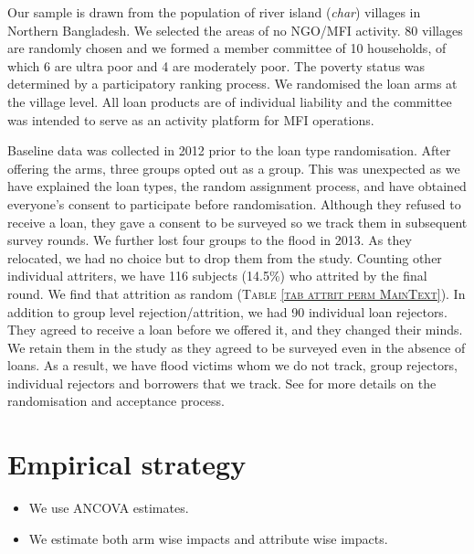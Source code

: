 	
	Our sample is drawn from the population of river island (\textit{char}) villages in Northern Bangladesh. We selected the areas of no NGO/MFI activity. 80 villages are randomly chosen and we formed a member committee of 10 households, of which 6 are ultra poor and 4 are moderately poor. The poverty status was determined by a participatory ranking process. We randomised the loan arms at the village level. All loan products are of individual liability and the committee was intended to serve as an activity platform for MFI operations. 

	Baseline data was collected in 2012 prior to the loan type randomisation. After offering the arms, three groups opted out as a group. This was unexpected as we have explained the loan types, the random assignment process, and have obtained everyone's consent to participate before randomisation. Although they refused to receive a loan, they gave a consent to be surveyed so we track them in subsequent survey rounds. We further lost four groups to the flood in 2013. As they relocated, we had no choice but to drop them from the study. Counting other individual attriters, we have 116 subjects (14.5\%) who attrited by the final round. We find that attrition as random (\textsc{\small Table \ref{tab attrit perm MainText}}). In addition to group level rejection/attrition, we had 90 individual loan rejectors. They agreed to receive a loan before we offered it, and they changed their minds. We retain them in the study as they agreed to be surveyed even in the absence of loans. %
As a result, we have flood victims whom we do not track, group rejectors, individual rejectors and borrowers that we track. See \citet{GUK2016} for more details on the randomisation and acceptance process.

\section{Empirical strategy}
\label{SecEmpiricalStrategy}

\begin{mdframed}[style={SecItemize}, frametitle={Empirical strategy}]
\begin{itemize}
\vspace{1.0ex}\setlength{\itemsep}{1.0ex}\setlength{\baselineskip}{12pt}
\item	We use ANCOVA estimates.
\item	We estimate both arm wise impacts and attribute wise impacts.
\end{itemize}
\end{mdframed}

